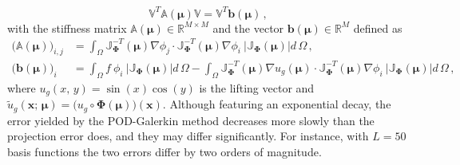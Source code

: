 \documentclass[12pt, a4paper, twoside, openright]{report}
\numberwithin{equation}{chapter}
\theoremstyle{theorem}
\theoremstyle{definition}
\theoremstyle{remark}
\theoremstyle{proposition}
\numberwithin{figure}{chapter}
\newcommand{\wt}[1]{\widetilde{#1}}
\newcommand{\bg}[1]{\boldsymbol{#1}}
\begin{document}
		\begin{equation*}
			\mathbb{V}^T \mathbb{A}(\bg{\mu}) \mathbb{V} = \mathbb{V}^T \mathbf{b}(\bg{\mu}) \, ,
		\end{equation*}
		with the stiffness matrix $\mathbb{A}(\bg{\mu}) \in \mathbb{R}^{M \times M}$ and the vector $\mathbf{b}(\bg{\mu}) \in \mathbb{R}^M$ defined as
		\begin{equation*}
			\begin{aligned}
				\big( \mathbb{A}(\bg{\mu}) \big)_{i,j} & = \int_{\Omega} \mathbb{J}_{\bg{\Phi}}^{-T}(\bg{\mu}) \nabla \phi_j \cdot \mathbb{J}_{\bg{\Phi}}^{-T}(\bg{\mu}) \nabla \phi_i ~ \lvert \mathbb{J}_{\bg{\Phi}}(\bg{\mu}) \rvert d \, \Omega \, , \\
				\big( \mathbf{b}(\bg{\mu}) \big)_i & = \int_{\Omega} f ~ \phi_i ~ \lvert \mathbb{J}_{\bg{\Phi}}(\bg{\mu}) \rvert d \, \Omega - \int_{\Omega} \mathbb{J}_{\bg{\Phi}}^{-T}(\bg{\mu}) \nabla u_g(\bg{\mu}) \cdot \mathbb{J}_{\bg{\Phi}}^{-T}(\bg{\mu}) \nabla \phi_i ~ \lvert \mathbb{J}_{\bg{\Phi}}(\bg{\mu}) \rvert d \, \Omega \, ,
			\end{aligned}
		\end{equation*}
		where $u_g(x, \, y) = \sin(x)\cos(y)$ is the lifting vector and $\wt{u}_g(\bg{x}; \, \bg{\mu}) = \big( u_g \circ \bg{\Phi}(\bg{\mu}) \big) (\bg{x})$. Although featuring an exponential decay, the error yielded by the POD-Galerkin method decreases more slowly than the projection error does, and they may differ significantly. For instance, with $L = 50$ basis functions the two errors differ by two orders of magnitude.
		
\end{document}
